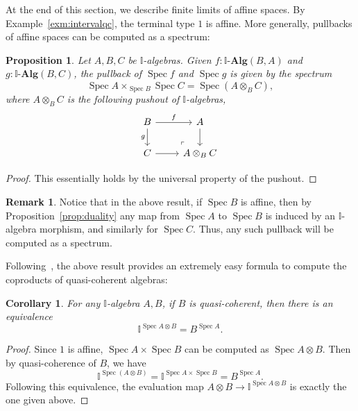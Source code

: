 \documentclass[12pt]{amsart}
\newtheorem{corollary}[theorem]{Corollary}
\newtheorem{proposition}[theorem]{Proposition}
\theoremstyle{definition}
\newtheorem{remark}[theorem]{Remark}
\newcommand{\mb}[1]{\mathbf{#1}}
\newcommand{\mbb}[1]{\mathbb{#1}}
\newcommand{\I}{\mbb I}
\newcommand{\alg}{\text{-}\mb{Alg}}
\newcommand{\spec}{\operatorname{Spec}}
\begin{document}
At the end of this section, we describe finite limits of affine spaces. By Example~\ref{exm:intervalqc}, the terminal type $1$ is affine. More generally, pullbacks of affine spaces can be computed as a spectrum:

\begin{proposition}\label{prop:pullbackofaffine}
  Let $A,B,C$ be $\I$-algebras. Given $f : \I\alg(B,A)$ and $g : \I\alg(B,C)$, the pullback of $\spec f$ and $\spec g$ is given by the spectrum
  \[ \spec A \times_{\spec B} \spec C = \spec (A \otimes_B C), \]
  where $A \otimes_B C$ is the following pushout of $\I$-algebras,
  \[
    \begin{tikzcd}
      B \ar[r, "f"] \ar[d, "g"'] & A \ar[d] \\
      C \ar[r] & A \otimes_B C
      \arrow["\lrcorner"{anchor=center, pos=0.125, rotate=180}, draw=none, from=2-2, to=1-1]
    \end{tikzcd}
  \]
\end{proposition}
\begin{proof}
  This essentially holds by the universal property of the pushout.
\end{proof}

\begin{remark}
  Notice that in the above result, if $\spec B$ is affine, then by Proposition~\ref{prop:duality} any map from $\spec A$ to $\spec B$ is induced by an $\I$-algebra morphism, and similarly for $\spec C$. Thus, any such pullback will be computed as a spectrum.
\end{remark}

Following~\cite{Cherubini_Coquand_Hutzler_2024}, the above result provides an extremely easy formula to compute the coproducts of quasi-coherent algebras:

\begin{corollary}\label{cor:tensorasspace}
  For any $\I$-algebra $A,B$, if $B$ is quasi-coherent, then there is an equivalence
  \[ \I^{\spec A \otimes B} = B^{\spec A}. \]
\end{corollary}
\begin{proof}
  Since $1$ is affine, $\spec A \times \spec B$ can be computed as $\spec A \otimes B$. Then by quasi-coherence of $B$, we have
  \[ \I^{\spec(A \otimes B)} = \I^{\spec A \times \spec B} = B^{\spec A}. \]
  Following this equivalence, the evaluation map $A \otimes B \to \I^{\spec A \otimes B}$ is exactly the one given above.
\end{proof}
\end{document}
